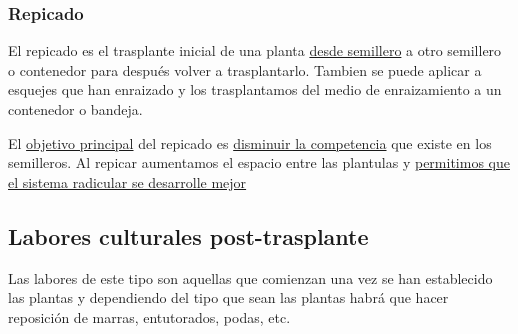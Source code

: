 \documentclass[a4paper,12pt,oneside]{article}
\begin{document}
\subsubsection{Repicado}
\label{sec:org9682e8d}
El repicado es el trasplante inicial de una planta \uline{desde semillero} a otro
semillero o contenedor para después volver a trasplantarlo. Tambien se puede
aplicar a esquejes que han enraizado y los trasplantamos del medio de
enraizamiento a un contenedor o bandeja.

El \uline{objetivo principal} del repicado es \uline{disminuir la competencia} que existe en
los semilleros. Al repicar aumentamos el espacio entre las plantulas y
\uline{permitimos que el sistema radicular se desarrolle mejor}

\subsection{Labores culturales post-trasplante}
\label{sec:org23e0866}
Las labores de este tipo son aquellas que comienzan una vez se han establecido
las plantas y dependiendo del tipo que sean las plantas habrá que hacer
reposición de marras, entutorados, podas, etc. 
\end{document}
